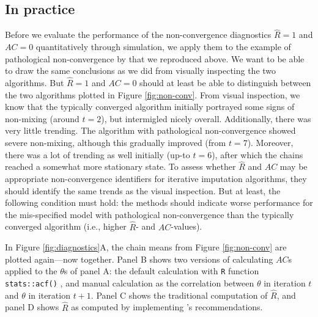 \documentclass[Royal,times,sageh]{sagej}
\begin{document}
\hypertarget{in-practice}{%
\subsection{In practice}\label{in-practice}}

Before we evaluate the performance of the non-convergence diagnostics
\(\widehat{R}=1\) and \(AC=0\) quantitatively through simulation, we
apply them to the example of pathological non-convergence by
\citet{buur18} that we reproduced above. We want to be able to draw the
same conclusions as we did from visually inspecting the two algorithms.
But \(\widehat{R}=1\) and \(AC=0\) should at least be able to
distinguish between the two algorithms plotted in Figure
\ref{fig:non-conv}. From visual inspection, we know that the typically
converged algorithm initially portrayed some signs of non-mixing (around
\(t=2\)), but intermigled nicely overall. Additionally, there was very
little trending. The algorithm with pathological non-convergence showed
severe non-mixing, although this gradually improved (from \(t=7\)).
Moreover, there was a lot of trending as well initially (up-to \(t=6\)),
after which the chains reached a somewhat more stationary state. To
assess whether \(\widehat{R}\) and \(AC\) may be appropriate
non-convergence identifiers for iterative imputation algorithms, they
should identify the same trends as the visual inspection. But at least,
the following condition must hold: the methods should indicate worse
performance for the mis-specified model with pathological
non-convergence than the typically converged algorithm (i.e., higher
\(\widehat{R}\)- and \(AC\)-values).

In Figure \ref{fig:diagnostics}A, the chain means from Figure
\ref{fig:non-conv} are plotted again---now together. Panel B shows two
versions of calculating \(AC\)s applied to the \(\theta\)s of panel A:
the default calculation with \texttt{R} function \texttt{stats::acf()}
\citep{R}, and manual calculation as the correlation between \(\theta\)
in iteration \(t\) and \(\theta\) in iteration \(t+1\). Panel C shows
the traditional computation of \(\widehat{R}\), and panel D shows
\(\widehat{R}\) as computed by implementing \citet{veht19} 's
recommendations.
\end{document}
